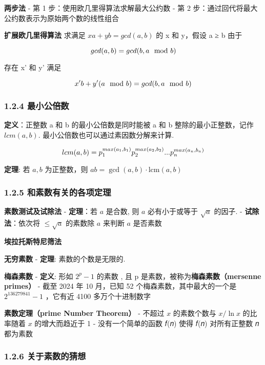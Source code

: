 \textbf{两步法} - 第 1 步：使用欧几里得算法求解最大公约数 - 第 2
步：通过回代将最大公约数表示为原始两个数的线性组合

\textbf{扩展欧几里得算法} 求满足 \(xa + yb = gcd(a, b)\) 的 x 和 y，假设
a ≥ b 由于

\[
\huge
gcd (a, b) = gcd(b, a\mod b)
\]

存在 x' 和 y' 满足

\[
\huge
x'b + y'( a\mod b) = gcd(b, a\mod b)
\]

\subsubsection{1.2.4 最小公倍数}\label{ux6700ux5c0fux516cux500dux6570}

\textbf{定义}：正整数 a 和 b 的最小公倍数是同时能被 a 和 b
整除的最小正整数，记作 \(lcm(a, b)\).
最小公倍数也可以通过素因数分解来计算.

\[
\huge
lcm(a,b)=p_1^{max(a_1,b_1)}p_2^{max(a_2,b_2)}...p_n^{max(a_n,b_n)}
\]

\textbf{定理}: 若 \(a, b\) 为正整数，则
\(ab = \gcd(a, b) \cdot \text{lcm}(a, b)\)

\subsubsection{1.2.5
和素数有关的各项定理}\label{ux548cux7d20ux6570ux6709ux5173ux7684ux5404ux9879ux5b9aux7406}

\textbf{素数测试及试除法} - \textbf{定理}：若 \(a\) 是合数, 则 \(a\)
必有小于或等于 \(\sqrt a\) 的因子. - \textbf{试除法}：依次将
\(\leq \sqrt a\) 的素数除 \(a\) 来判断 \(a\) 是否素数

\textbf{埃拉托斯特尼筛法}

\textbf{无穷素数} - \textbf{定理}: 素数的个数是无限的.

\textbf{梅森素数} - \textbf{定义}: 形如 \(2^p-1\) 的素数 , 且 p
是素数，被称为\textbf{梅森素数（mersenne primes）} - 截至 2024 年 10
月，已知 52 个梅森素数，其中最大的一个是 \(2^{136279841} − 1\) ，它有近
4100 多万个十进制数字

\textbf{素数定理（prime Number Theorem）} - 不超过 \(x\) 的素数个数与
\(x/ \ln x\) 的比率随着 \(x\) 的增大而趋近于 1 - 没有一个简单的函数 𝑓(𝑛)
使得 𝑓(𝑛) 对所有正整数 𝑛 都为素数

\subsubsection{1.2.6
关于素数的猜想}\label{ux5173ux4e8eux7d20ux6570ux7684ux731cux60f3}

